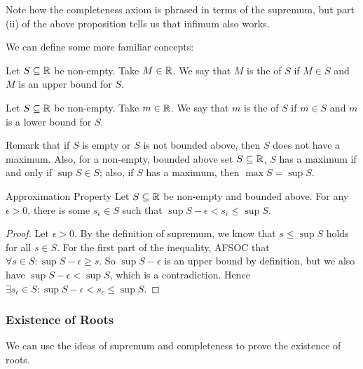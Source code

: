 \documentclass{styles/tufte}
\begin{document}
      Note how the completeness axiom is phrased in terms of the supremum, but part (ii) of the above proposition tells us that infimum also works.
      
      We can define some more familiar concepts:
      
      \begin{definition}{}{}
        Let $S \subseteq \mathbb{R}$ be non-empty. Take $M \in \mathbb{R}$. We say that $M$ is the  of $S$ if $M \in S$ and $M$ is an upper bound for $S$.
      \end{definition}
      
      \begin{definition}{}{}
        Let $S \subseteq \mathbb{R}$ be non-empty. Take $m \in \mathbb{R}$. We say that $m$ is the  of $S$ if $m \in S$ and $m$ is a lower bound for $S$.
      \end{definition}
      
      Remark that if $S$ is empty or $S$ is not bounded above, then $S$ does not have a maximum. Also, for a non-empty, bounded above set $S \subseteq \mathbb{R}$, $S$ has a maximum if and only if $\sup S \in S$; also, if $S$ has a maximum, then $\max S = \sup S$.
      
      \begin{proposition}{Approximation Property}{}
        Let $S \subseteq \mathbb{R}$ be non-empty and bounded above. For any $\epsilon > 0$, there is some $s_\epsilon \in S$ such that $\sup S - \epsilon < s_\epsilon \leqslant \sup S$.
      \end{proposition}
      \begin{proof}
        Let $\epsilon > 0$. By the definition of supremum, we know that $s \leqslant \sup S$ holds for all $s \in S$. For the first part of the inequality, AFSOC that $\forall s \in S : \sup S - \epsilon \geqslant s$. So $\sup S - \epsilon$ is an upper bound by definition, but we also have $\sup S - \epsilon < \sup S$, which is a contradiction. Hence $\exists s_\epsilon \in S : \sup S - \epsilon < s_\epsilon \leqslant \sup S$.
      \end{proof}
    
    \subsubsection{Existence of Roots}
      
      We can use the ideas of supremum and completeness to prove the existence of roots.
      
\end{document}

